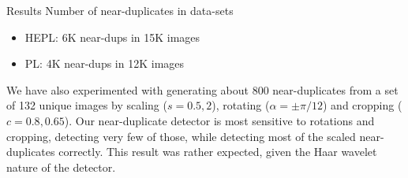 

\begin{xpsectionbox}{Results}{}
Number of near-duplicates in data-sets %
\begin{itemize}
	\item HEPL: 6K near-dups in 15K images
	\item PL: 4K near-dups in 12K images
\end{itemize}
We have also experimented with generating about 800 near-duplicates from a set of 132 unique images by scaling ($s=0.5, 2$), rotating ($\alpha=\pm\pi/12$) and cropping ($c=0.8, 0.65$). Our near-duplicate detector is most sensitive to rotations and cropping, detecting very few of those, while detecting most of the scaled near-duplicates correctly. This result was rather expected, given the Haar wavelet nature of the detector.
\end{xpsectionbox}